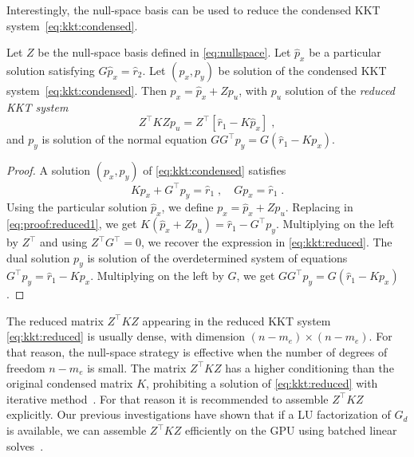 Interestingly, the null-space basis can be used to reduce the condensed
KKT system~\eqref{eq:kkt:condensed}.

\begin{proposition}
  Let $Z$ be the null-space basis defined in \eqref{eq:nullspace}.
  Let $\hat{p}_x$ be a particular solution satisfying $G \hat{p}_x = \hat{r}_2$.
  Let $(p_x, p_y)$ be
  solution of the condensed KKT system~\eqref{eq:kkt:condensed}.
  Then $p_x= \hat{p}_x + Z p_u$, with $p_u$ solution of the \emph{reduced KKT system}
  \begin{equation}
    \label{eq:kkt:reduced}
    \tag{$K_0$}
    Z^\top K Z p_u =
    Z^\top [\hat{r}_1 - K \hat{p}_x ] \; ,
  \end{equation}
  and $p_y$ is solution of the normal equation $G G^\top p_y = G (\hat{r}_1 - K p_x)$.
\end{proposition}
\begin{proof}
  A solution $(p_x, p_y)$ of \eqref{eq:kkt:condensed} satisfies
  \begin{equation}
    \label{eq:proof:reduced1}
    K p_x + G^\top p_y = \hat{r}_1 \; , \quad
    G p_x = \hat{r}_1  \; .
  \end{equation}
  Using the particular solution $\hat{p}_x$, we define
  $p_x = \hat{p}_x + Z p_u$. Replacing in \eqref{eq:proof:reduced1},
  we get $K (\hat{p}_x + Z p_u) = \hat{r}_1 - G^\top p_y$.
  Multiplying on the left by $Z^\top$ and using $Z^\top G^\top = 0$,
  we recover the expression in \eqref{eq:kkt:reduced}.
  The dual solution $p_y$ is solution of the overdetermined
  system of equations $G^\top p_y = \hat{r}_1 - K p_x$.
  Multiplying on the left by $G$, we get $G G^\top p_y =
  G (\hat{r}_1 - K p_x)$.
\end{proof}

The reduced matrix $Z^\top K Z$ appearing in the reduced KKT system
\eqref{eq:kkt:reduced} is usually dense, with dimension $(n-m_e) \times
(n - m_e)$. For that reason, the null-space strategy is effective
when the number of degrees of freedom $n - m_e$ is small.
The matrix $Z^\top K Z$ has a higher conditioning than the original
condensed matrix $K$, prohibiting a solution of \eqref{eq:kkt:reduced}
with iterative method~\cite{gould2001solution}. For that reason
it is recommended to assemble $Z^\top K Z$ explicitly. Our previous
investigations have shown that if a LU factorization of $G_d$ is
available, we can assemble $Z^\top K Z$ efficiently on the GPU
using batched linear solves~\cite{pacaud2022condensed}.

